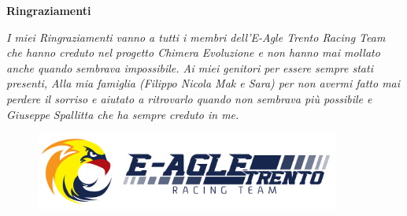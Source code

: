 \thispagestyle{empty}

\begin{center}
  {\bf \Huge Ringraziamenti}
\end{center}

\vspace{4cm}

\emph{
  I miei Ringraziamenti vanno a tutti i membri dell'E-Agle Trento Racing Team che hanno creduto nel progetto Chimera Evoluzione 
  e non hanno mai mollato anche quando sembrava impossibile.
  Ai miei genitori per essere sempre stati presenti, 
  Alla mia famiglia (Filippo Nicola Mak e Sara) per non avermi fatto mai perdere il sorriso e aiutato a ritrovarlo quando non sembrava più possibile
  e Giuseppe Spallitta che ha sempre creduto in me.
}

\begin{figure}[!b]
  \centering
  \includegraphics[width=10cm]{./figures/wallpaper.png}
\end{figure}

\newpage
